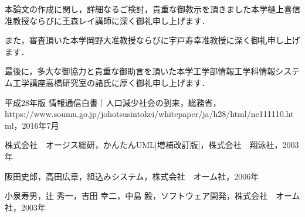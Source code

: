 本論文の作成に関し，詳細なるご検討，貴重な御教示を頂きました本学樋上喜信准教授ならびに王森レイ講師に深く御礼申し上げます．

また，審査頂いた本学岡野大准教授ならびに宇戸寿幸准教授に深く御礼申し上げます．

最後に，多大な御協力と貴重な御助言を頂いた本学工学部情報工学科情報システム工学講座高橋研究室の諸氏に厚く御礼申し上げます．


\begin{thebibliography}{99}

平成28年版 情報通信白書｜人口減少社会の到来，総務省，https://www.soumu.go.jp/johotsusintokei/whitepaper/ja/h28/html/nc111110.html，2016年7月


株式会社　オージス総研，かんたんUML[増補改訂版]，株式会社　翔泳社，2003年


阪田史郎，高田広章，組込みシステム，株式会社　オーム社，2006年


小泉寿男，辻 秀一，吉田 幸二，中島 毅，ソフトウェア開発，株式会社　オーム社，2003年


\end{thebibliography}

